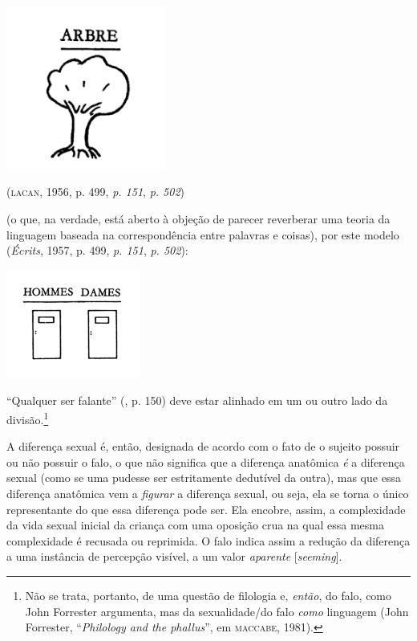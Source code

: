 \begin{center}
\includegraphics[width=2.06597in,height=2.11319in]{./img1.jpg}

(\textsc{lacan}, 1956, p. 499, \emph{p. 151}, \emph{p. 502})
\end{center}

\noindent{}(o que, na verdade, está aberto à objeção de parecer reverberar uma
teoria da linguagem baseada na correspondência entre palavras e coisas),
por este modelo (\emph{Écrits}, 1957, p. 499, \emph{p. 151}, \emph{p.
502}):

\begin{center}
\includegraphics[width=1.72639in,height=1.40556in]{./img2.jpg}
\end{center}

``Qualquer ser falante'' (, p. 150) deve estar alinhado em um ou outro
lado da divisão.\footnote{Não se trata, portanto, de uma questão de
  filologia e, \emph{então}, do falo, como John Forrester argumenta, mas
  da sexualidade/do falo \emph{como} linguagem (John Forrester,
  ``\emph{Philology and the phallus}'', em \textsc{maccabe}, 1981).}

A diferença sexual é, então, designada de acordo com o fato de o sujeito
possuir ou não possuir o falo, o que não significa que a diferença
anatômica \emph{é} a diferença sexual (como se uma pudesse ser
estritamente dedutível da outra), mas que essa diferença anatômica vem a
\emph{figurar} a diferença sexual, ou seja, ela se torna o único
representante do que essa diferença pode ser. Ela encobre, assim, a
complexidade da vida sexual inicial da criança com uma oposição crua na
qual essa mesma complexidade é recusada ou reprimida. O falo indica
assim a redução da diferença a uma instância de percepção visível, a um
valor \emph{aparente} {[}\emph{seeming}{]}.

